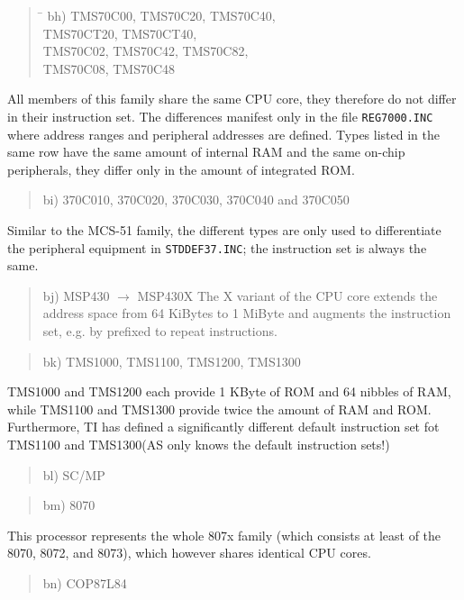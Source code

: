 \documentclass[12pt,twoside]{report}
\newcommand{\tty}[1]{{\tt #1}}
\begin{document}
\begin{quote}
\begin{tabbing}
\hspace{0.7cm} \= \kill
bh) \> TMS70C00, TMS70C20, TMS70C40,\\
    \> TMS70CT20, TMS70CT40,\\
    \> TMS70C02, TMS70C42, TMS70C82,\\
    \> TMS70C08, TMS70C48\\
\end{tabbing}
\end{quote}
All members of this family share the same CPU core, they therefore do not
differ in their instruction set.  The differences manifest only in the
file \tty{REG7000.INC} where address ranges and peripheral addresses are
defined.  Types listed in the same row have the same amount of internal
RAM and the same on-chip peripherals, they differ only in the amount of
integrated ROM.
\begin{quote}
bi) 370C010, 370C020, 370C030, 370C040 and 370C050
\end{quote}
Similar to the MCS-51 family, the different types are only used to
differentiate the peripheral equipment in \tty{STDDEF37.INC}; the
instruction set is always the same.
\begin{quote}
bj) MSP430 $\rightarrow$ MSP430X
The X variant of the CPU core extends the address space from 64
KiBytes to 1 MiByte and augments the instruction set, e.g. by
prefixed to repeat instructions.
\end{quote}
\begin{quote}
bk) TMS1000, TMS1100, TMS1200, TMS1300
\end{quote}
TMS1000 and TMS1200 each provide 1 KByte of ROM and 64 nibbles of
RAM, while TMS1100 and TMS1300 provide twice the amount of RAM
and ROM.  Furthermore, TI has defined a significantly different
default instruction set fot TMS1100 and TMS1300(AS only knows the
default instruction sets!)
\begin{quote}
bl) SC/MP
\end{quote}
\begin{quote}
bm) 8070
\end{quote}
This processor represents the whole 807x family (which consists at least
of the 8070, 8072, and 8073), which however shares identical CPU cores.
\begin{quote}
bn) COP87L84
\end{quote}
\end{document}
